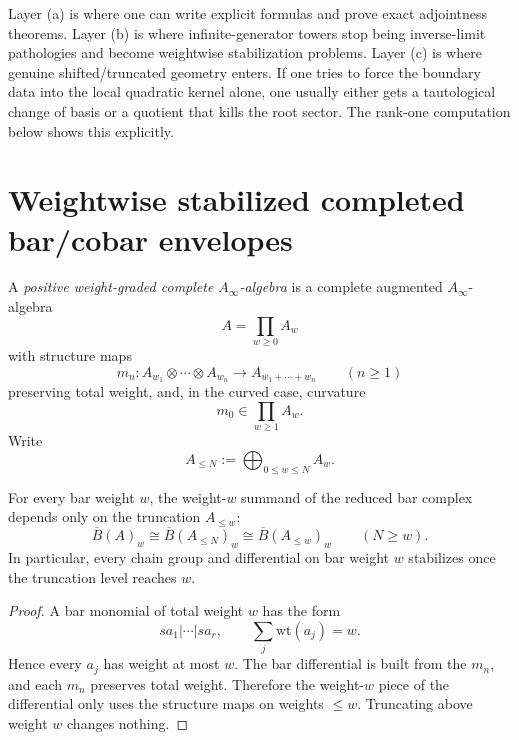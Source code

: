 \begin{remark}
\label{rem:why-the-distinction-matters}
Layer \textup{(a)} is where one can write explicit formulas and prove exact
adjointness theorems. Layer \textup{(b)} is where infinite-generator towers stop
being inverse-limit pathologies and become weightwise stabilization problems.
Layer \textup{(c)} is where genuine shifted/truncated geometry enters. If one
tries to force the boundary data into the local quadratic kernel alone, one
usually either gets a tautological change of basis or a quotient that kills the
root sector. The rank-one computation below shows this explicitly.
\end{remark}

\section{Weightwise stabilized completed bar/cobar envelopes}
\label{sec:weightwise-stabilized}

\begin{definition}
\label{def:positive-weight-complete-ainfty}
A \emph{positive weight-graded complete $A_\infty$-algebra} is a complete
augmented $A_\infty$-algebra
\[
A=\prod_{w\ge 0}A_w
\]
with structure maps
\[
m_n\colon A_{w_1}\otimes\cdots\otimes A_{w_n}\longrightarrow A_{w_1+\cdots+w_n}
\qquad (n\ge 1)
\]
preserving total weight, and, in the curved case, curvature
\[
m_0\in \prod_{w\ge 1} A_w.
\]
Write
\[
A_{\le N}:=\bigoplus_{0\le w\le N}A_w.
\]
\end{definition}

\begin{lemma}
\label{lem:weightwise-stabilization-bar-complex}
For every bar weight $w$, the weight-$w$ summand of the reduced bar complex
depends only on the truncation $A_{\le w}$:
\[
\overline{B}(A)_w\cong \overline{B}(A_{\le N})_w\cong \overline{B}(A_{\le w})_w
\qquad (N\ge w).
\]
In particular, every chain group and differential on bar weight $w$ stabilizes
once the truncation level reaches $w$.
\end{lemma}

\begin{proof}
A bar monomial of total weight $w$ has the form
\[
sa_1|\cdots|sa_r,
\qquad \sum_j \mathrm{wt}(a_j)=w.
\]
Hence every $a_j$ has weight at most $w$. The bar differential is built from
the $m_n$, and each $m_n$ preserves total weight. Therefore the weight-$w$
piece of the differential only uses the structure maps on weights $\le w$.
Truncating above weight $w$ changes nothing.
\end{proof}

